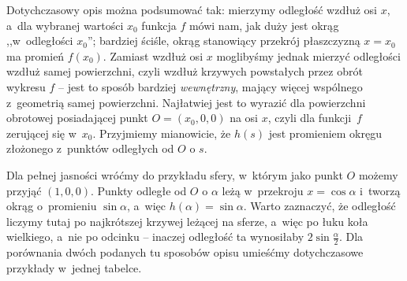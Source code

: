 Dotychczasowy opis można podsumować tak: mierzymy odległość wzdłuż osi $x$, a~dla wybranej wartości $x_0$ funkcja $f$ mówi nam, jak duży jest okrąg ,,w~odległości $x_0$''; bardziej ściśle, okrąg stanowiący przekrój płaszczyzną $x = x_0$ ma promień $f(x_0)$.  Zamiast wzdłuż osi $x$ moglibyśmy jednak mierzyć odległości wzdłuż samej powierzchni, czyli wzdłuż krzywych powstałych przez obrót wykresu $f$ -- jest to sposób bardziej \emph{wewnętrzny}, mający więcej wspólnego z~geometrią samej powierzchni. Najłatwiej jest to wyrazić dla powierzchni obrotowej posiadającej punkt $O = (x_0,0,0)$ na osi $x$, czyli dla funkcji~$f$ zerującej się w~$x_0$. Przyjmiemy mianowicie, że $h(s)$ jest promieniem okręgu złożonego z~punktów odległych od $O$ o $s$. 

Dla pełnej jasności wróćmy do przykładu sfery, w~którym jako punkt $O$ możemy przyjąć $(1,0,0)$. Punkty odległe od $O$ o $\alpha$ leżą w~przekroju $x = \cos \alpha$ i~tworzą okrąg o~promieniu $\sin \alpha$, a~więc $h(\alpha) = \sin \alpha$. 
Warto zaznaczyć, że odległość liczymy tutaj po najkrótszej krzywej leżącej na sferze, a~więc po łuku koła wielkiego, a~nie po odcinku -- inaczej odległość ta wynosiłaby $2 \sin \frac{\alpha}{2}$. Dla porównania dwóch podanych tu sposobów opisu umieśćmy dotychczasowe przykłady w~jednej tabelce. 


